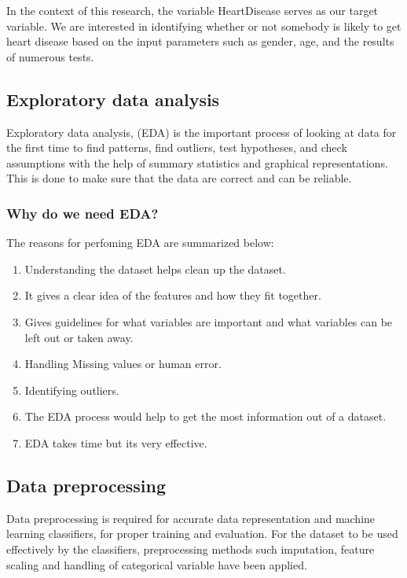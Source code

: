 In the context of this research, the variable HeartDisease serves as our target variable. We are interested in identifying whether or not somebody is likely to get heart disease based on the input parameters such as gender, age, and the results of numerous tests.

\subsection{Exploratory data analysis}
Exploratory data analysis, (EDA) is the important process of looking at data for the first time to find patterns, find outliers, test hypotheses, and check assumptions with the help of summary statistics and graphical representations. This is done to make sure that the data are correct and can be reliable. 

\subsubsection{Why do we need EDA?}
The reasons for perfoming EDA are summarized below:

\begin{enumerate}
	\item Understanding the dataset helps clean up the dataset.
	\item It gives a clear idea of the features and how they fit together.
	\item Gives guidelines for what variables are important and what variables can be left out or taken away.
	\item Handling Missing values or human error.
	\item Identifying outliers.
	\item The EDA process would help to get the most information out of a dataset.
	\item EDA takes time but its very effective.
\end{enumerate}

\subsection{Data preprocessing}
Data preprocessing is required for accurate data representation and machine learning classifiers, for proper training and evaluation. For the dataset to be used effectively by the classifiers, preprocessing methods such imputation, feature scaling and handling of categorical variable have been applied.

